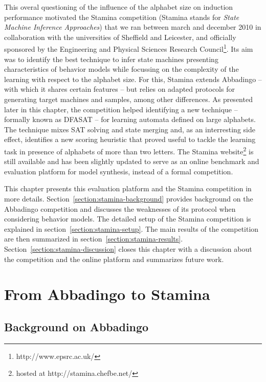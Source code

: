 This overal questioning of the influence of the alphabet size on induction performance motivated the Stamina competition (Stamina stands for \emph{State Machine Inference Approaches}) that we ran between march and december 2010 in collaboration with the universities of Sheffield and Leicester, and officially sponsored by the Engineering and Physical Sciences Research Council\footnote{http://www.epsrc.ac.uk/}. Its aim was to identify the best technique to infer state machines presenting characteristics of behavior models while focussing on the complexity of the learning with respect to the alphabet size. For this, Stamina extends Abbadingo -- with which it shares certain features -- but relies on adapted protocols for generating target machines and samples, among other differences. As presented later in this chapter, the competition helped identifying a new technique -- formally known as DFASAT -- for learning automata defined on large alphabets. The technique mixes SAT solving and state merging and, as an interresting side effect, identifies a new scoring heuristic that proved useful to tackle the learning task in presence of alphabets of more than two letters. The Stamina website\footnote{hosted at http://stamina.chefbe.net/} is still available and has been slightly updated to serve as an online benchmark and evaluation platform for model synthesis, instead of a formal competition.

This chapter presents this evaluation platform and the Stamina competition in more details. Section~\ref{section:stamina-background} provides background on the Abbadingo competition and discusses the weaknesses of its protocol when considering behavior models. The detailed setup of the Stamina competition is explained in section~\ref{section:stamina-setup}. The main results of the competition are then summarized in section~\ref{section:stamina-results}. Section~\ref{section:stamina-discussion} closes this chapter with a discussion about the competition and the online platform and summarizes future work.

\section{From Abbadingo to Stamina\label{section:stamina-background}}

\subsection{Background on Abbadingo}

